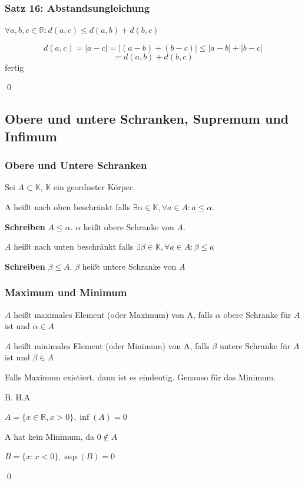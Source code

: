 \documentclass[fleqn]{scrartcl}
\renewenvironment{proof}{{\bfseries Beweis }}{\qed}
\begin{document}
\subsubsection{Satz 16: Abstandsungleichung}

$\forall a,b,c \in \mathbb{R}: d(a,c) \leq d(a,b)+d(b,c)$

\begin{proof}

\[d(a,c)=|a-c|=|(a-b)+(b-c)| \leq |a-b|+|b-c|\]
\[=d(a,b)+d(b,c)\]
fertig

\end{proof}

\subsection{Obere und untere Schranken, Supremum und Infimum}

\subsubsection{Obere und Untere Schranken}

Sei $A \subset \mathbb{K}$, $\mathbb{K}$ ein geordneter Körper.

A heißt nach oben beschränkt falls $ \exists \alpha \in \mathbb{K}, \forall a \in A : a \leq \alpha$.

\textbf{Schreiben} $A \leq \alpha$. $\alpha$ heißt obere Schranke von $A$.

$A$ heißt nach unten beschränkt falls $\exists \beta \in \mathbb{K},\forall a \in A: \beta \leq a$

\textbf{Schreiben} $\beta \leq A$. $\beta$ heißt untere Schranke von $A$

\subsubsection{Maximum und Minimum}

$A$ heißt maximales Element (oder Maximum) von A, falls $\alpha$ obere 
Schranke für $A$ ist und $\alpha \in A$

$A$ heißt minimales Element (oder Minimum) von A, falls $\beta$ untere Schranke für $A$ ist und $\beta \in A$

\begin{proof}
Falls Maximum existiert, dann ist es eindeutig. Genauso für das Minimum. 

B. \quad H.A %

$A=\{x \in \mathbb{R}, x>0\}, \inf(A)=0$

A hat kein Minimum, da $0 \notin A$

$B=\{x:x<0\}, \sup(B)=0$

\end{proof}
\end{document}
